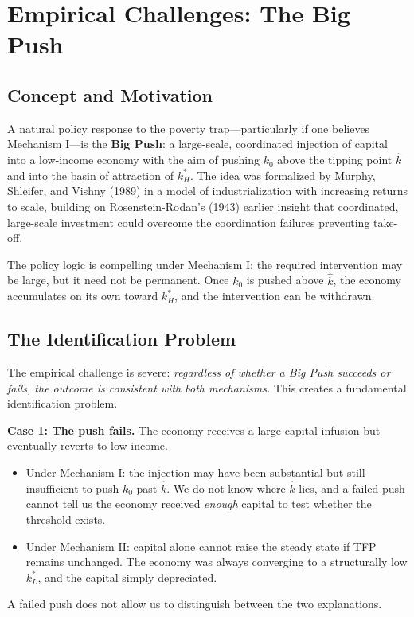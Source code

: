 \section{Empirical Challenges: The Big Push}

\subsection{Concept and Motivation}

A natural policy response to the poverty trap---particularly if one believes Mechanism I---is the \textbf{Big Push}: a large-scale, coordinated injection of capital into a low-income economy with the aim of pushing $k_0$ above the tipping point $\hat{k}$ and into the basin of attraction of $k_H^*$. The idea was formalized by Murphy, Shleifer, and Vishny (1989) in a model of industrialization with increasing returns to scale, building on Rosenstein-Rodan's (1943) earlier insight that coordinated, large-scale investment could overcome the coordination failures preventing take-off.

The policy logic is compelling under Mechanism I: the required intervention may be large, but it need not be permanent. Once $k_0$ is pushed above $\hat{k}$, the economy accumulates on its own toward $k_H^*$, and the intervention can be withdrawn.

\subsection{The Identification Problem}

The empirical challenge is severe: \textit{regardless of whether a Big Push succeeds or fails, the outcome is consistent with both mechanisms.} This creates a fundamental identification problem.

\medskip

\noindent\textbf{Case 1: The push fails.} The economy receives a large capital infusion but eventually reverts to low income.

\begin{itemize}
    \item Under Mechanism I: the injection may have been substantial but still insufficient to push $k_0$ past $\hat{k}$. We do not know where $\hat{k}$ lies, and a failed push cannot tell us the economy received \textit{enough} capital to test whether the threshold exists.
    \item Under Mechanism II: capital alone cannot raise the steady state if TFP remains unchanged. The economy was always converging to a structurally low $k_L^*$, and the capital simply depreciated.
\end{itemize}
A failed push does not allow us to distinguish between the two explanations.

